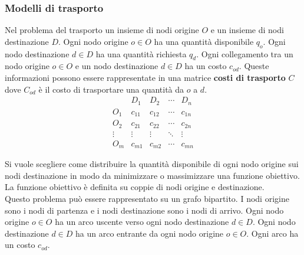 \documentclass{article}
\begin{document}
\subsubsection{Modelli di trasporto}
Nel problema del trasporto un insieme di nodi origine $O$ e un insieme di nodi 
destinazione $D$. Ogni nodo origine $o \in O$ ha una quantità disponibile $q_o$.
Ogni nodo destinazione $d \in D$ ha una quantità richiesta $q_d$. Ogni collegamento 
tra un nodo origine $o \in O$ e un nodo destinazione $d \in D$ ha un costo 
$c_{od}$. Queste informazioni possono essere rappresentate in una matrice 
\textbf{costi di trasporto} $C$ dove $C_{od}$ è il costo di trasportare una 
quantità da $o$ a $d$. 
\begin{equation*}
  \begin{matrix}
    &   D_1 & D_2 & \cdots & D_n \\ 
    O_1 & c_{11} & c_{12} & \cdots & c_{1n} \\
    O_2 & c_{21} & c_{22} & \cdots & c_{2n} \\
    \vdots & \vdots & \vdots & \ddots & \vdots \\
    O_m & c_{m1} & c_{m2} & \cdots & c_{mn}
  \end{matrix}
\end{equation*}

Si vuole scegliere come distribuire la quantità disponibile di ogni nodo origine 
sui nodi destinazione in modo da minimizzare o massimizzare una funzione
obiettivo. La funzione obiettivo è definita su coppie di nodi origine e 
destinazione.\\
Questo problema può essere rappresentato su un grafo bipartito. I nodi origine
sono i nodi di partenza e i nodi destinazione sono i nodi di arrivo. Ogni nodo 
origine $o \in O$ ha un arco uscente verso ogni nodo destinazione $d \in D$. 
Ogni nodo destinazione $d \in D$ ha un arco entrante da ogni nodo origine $o \in 
O$. Ogni arco ha un costo $c_{od}$. 
\end{document}
